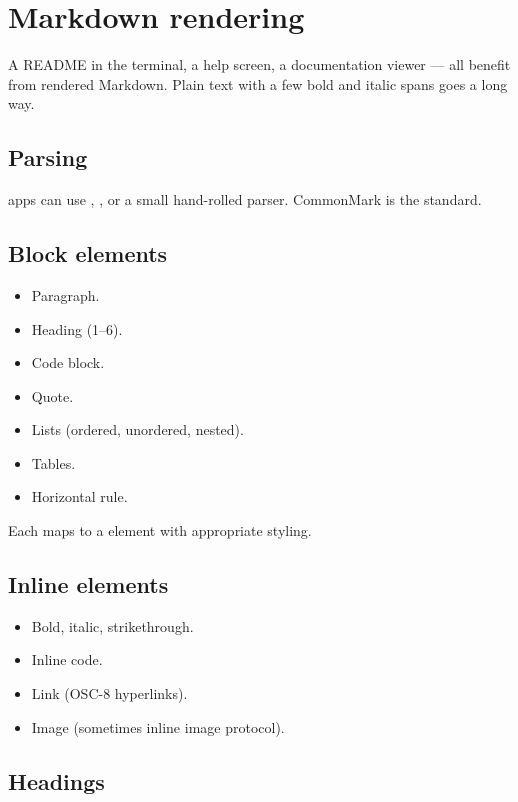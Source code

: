 \chapter{Markdown rendering}
\label{ch:markdown}

\begin{aside}
A README in the terminal, a help screen, a documentation
viewer --- all benefit from rendered Markdown. Plain text with
a few bold and italic spans goes a long way.
\end{aside}

\section{Parsing}

\maya{} apps can use , , or a small
hand-rolled parser. CommonMark is the standard.

\section{Block elements}

\begin{itemize}[leftmargin=*]
  \item Paragraph.
  \item Heading (1--6).
  \item Code block.
  \item Quote.
  \item Lists (ordered, unordered, nested).
  \item Tables.
  \item Horizontal rule.
\end{itemize}

Each maps to a \maya{} element with appropriate styling.

\section{Inline elements}

\begin{itemize}[leftmargin=*]
  \item Bold, italic, strikethrough.
  \item Inline code.
  \item Link (OSC-8 hyperlinks).
  \item Image (sometimes inline image protocol).
\end{itemize}

\section{Headings}


